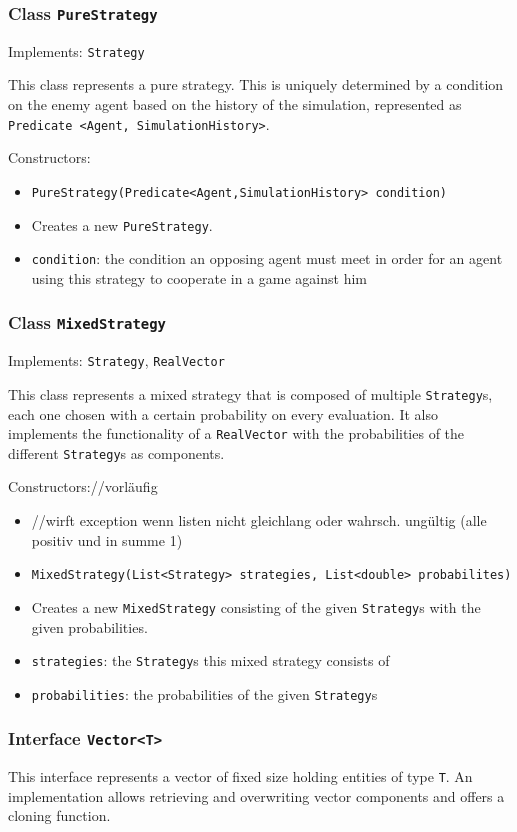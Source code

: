 \documentclass[parskip=full,11pt]{scrartcl}
\begin{document}
\subsubsection{Class \texttt{PureStrategy}}
Implements: \texttt{Strategy}

This class represents a pure strategy. This is uniquely determined by a condition on the enemy agent based on the history of the simulation, represented as \texttt{Predicate <Agent, SimulationHistory>}.

Constructors:
\begin{itemize}\itemsep -10pt
\item \texttt{PureStrategy(Predicate<Agent,SimulationHistory> condition)}
\item[] Creates a new \texttt{PureStrategy}.
\item[] \texttt{condition}: the condition an opposing agent must meet in order for an agent using this strategy to cooperate in a game against him
\end{itemize}

\subsubsection{Class \texttt{MixedStrategy}}
Implements: \texttt{Strategy}, \texttt{RealVector}

This class represents a mixed strategy that is composed of multiple \texttt{Strategy}s, each one chosen with a certain probability on every evaluation. It also implements the functionality of a \texttt{RealVector} with the probabilities of the different \texttt{Strategy}s as components.

Constructors://vorläufig
\begin{itemize}\itemsep -10pt
\item[] //wirft exception wenn listen nicht gleichlang oder wahrsch. ungültig (alle positiv und in summe 1)
\item \texttt{MixedStrategy(List<Strategy> strategies, List<double> probabilites)}
\item[] Creates a new \texttt{MixedStrategy} consisting of the given \texttt{Strategy}s with the given probabilities.
\item[] \texttt{strategies}: the \texttt{Strategy}s this mixed strategy consists of
\item[] \texttt{probabilities}: the probabilities of the given \texttt{Strategy}s
\end{itemize}

\subsubsection{Interface \texttt{Vector<T>}}
This interface represents a vector of fixed size holding entities of type \texttt{T}. An implementation allows retrieving and overwriting vector components and offers a cloning function.
\end{document}
